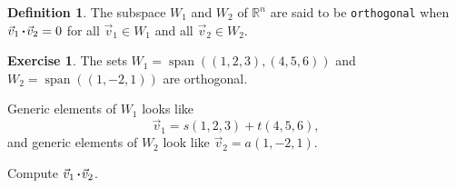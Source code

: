 \documentclass{beamer}
\newcommand{\R}{\mathbb{R}}
\newcommand{\fn}{\insertframenumber}
\newcommand{\col}{\operatorname{col}}
\newcommand{\san}{\operatorname{span}}
\newcommand{\dotp}{\,{\boldsymbol{\cdot}\hspace*{.01in}}}
\theoremstyle{definition}
\newtheorem{exercise}{Exercise}
\newtheorem*{defn}{Definition}
\renewcommand{\emph}[1]{{\color{blue}\texttt{#1}}}
\begin{document}
%			
\begin{frame}{\fn}
	\begin{defn}
		The subspace $W_1$ and $W_2$ of $\R^n$ are said to be \emph{orthogonal} when $\vec v_1\dotp\vec v_2=0$ for all $\vec v_1\in W_1$ and all $\vec v_2\in W_2$.
	\end{defn}
	\begin{exercise}
		The sets $W_1=\san((1,2,3),(4,5,6))$ and $W_2=\san((1,-2,1))$ are orthogonal.  
		
		Generic elements of $W_1$ looks like
			\[\vec v_1=s(1,2,3)+t(4,5,6),\]
		and generic elements of $W_2$ look like $\vec v_2=a(1,-2,1)$.
		
		Compute $\vec v_1\dotp\vec v_2$.
	\end{exercise}
\end{frame}
\end{document}
